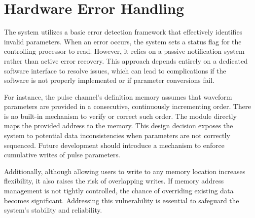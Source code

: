 \section{Hardware Error Handling}

The system utilizes a basic error detection framework that effectively identifies invalid parameters. When an error occurs, the system sets a status flag for the controlling processor to read. However, it relies on a passive notification system rather than active error recovery. This approach depends entirely on a dedicated software interface to resolve issues, which can lead to complications if the software is not properly implemented or if parameter conversions fail.

For instance, the pulse channel's definition memory assumes that waveform parameters are provided in a consecutive, continuously incrementing order. There is no built-in mechanism to verify or correct such order. The module directly maps the provided address to the memory. This design decision exposes the system to potential data inconsistencies when parameters are not correctly sequenced. Future development should introduce a mechanism to enforce cumulative writes of pulse parameters. 

Additionally, although allowing users to write to any memory location increases flexibility, it also raises the risk of overlapping writes. If memory address management is not tightly controlled, the chance of overriding existing data becomes significant. Addressing this vulnerability is essential to safeguard the system's stability and reliability.
